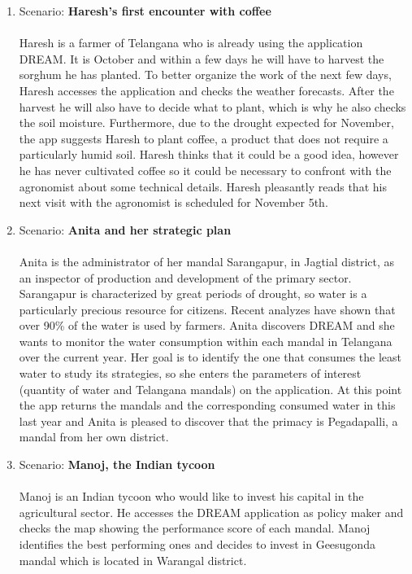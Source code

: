 \begin{enumerate}
\item Scenario: \textbf{Haresh's first encounter with coffee}\\\\
Haresh is a farmer of Telangana who is already using the application DREAM. It is October and within a few days he will have to harvest the sorghum he has planted. To better organize the work of the next few days, Haresh accesses the application and checks the weather forecasts. After the harvest he will also have to decide what to plant, which is why he also checks the soil moisture. Furthermore, due to the drought expected for November, the app suggests Haresh to plant coffee, a product that does not require a particularly humid soil. Haresh thinks that it could be a good idea, however he has never cultivated coffee so it could be necessary to confront with the agronomist about some technical details. Haresh pleasantly reads that his next visit with the agronomist is scheduled for November 5th.
\\


\item Scenario: \textbf{Anita and her strategic plan}\\\\
Anita is the administrator of her mandal Sarangapur, in Jagtial district, as an inspector of production and development of the primary sector. Sarangapur is characterized by great periods of drought, so water is a particularly precious resource for citizens.
Recent analyzes have shown that over 90\% of the water is used by farmers.
Anita discovers DREAM and she wants to monitor the water consumption within each mandal in Telangana over the current year. Her goal is to identify the one that consumes the least water to study its strategies, so she enters the parameters of interest (quantity of water and Telangana mandals) on the application.
At this point the app returns the mandals and the corresponding consumed water in this last year and Anita is pleased to discover that the primacy is Pegadapalli, a mandal from her own district.\\

\item Scenario: \textbf{Manoj, the Indian tycoon}\\\\
Manoj is an Indian tycoon who would like to invest his capital in the agricultural sector. He accesses the DREAM application as policy maker and checks the map showing the performance score of each mandal. Manoj identifies the best performing ones and decides to invest in Geesugonda mandal which is located in Warangal district.\\


\end{enumerate}
